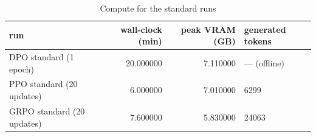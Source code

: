 \begin{table}
\caption{Compute for the standard runs}
\label{tab:t_compute}
\begin{tabular}{lrrl}
\toprule
run & wall-clock (min) & peak VRAM (GB) & generated tokens \\
\midrule
DPO standard (1 epoch) & 20.000000 & 7.110000 & — (offline) \\
PPO standard (20 updates) & 6.000000 & 7.010000 & 6299 \\
GRPO standard (20 updates) & 7.600000 & 5.830000 & 24063 \\
\bottomrule
\end{tabular}
\end{table}
